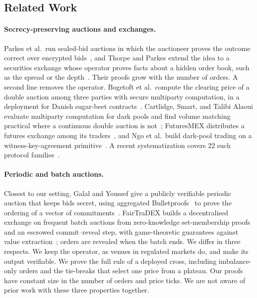 \subsection{Related Work}
\label{sec:related}

\paragraph{Secrecy-preserving auctions and exchanges.}
Parkes et al.\ run sealed-bid auctions in which the auctioneer proves the outcome correct over encrypted bids~\cite{parkes2008}, and Thorpe and Parkes extend the idea to a securities exchange whose operator proves facts about a hidden order book, such as the spread or the depth~\cite{thorpe2007}. Their proofs grow with the number of orders. A second line removes the operator. Bogetoft et al.\ compute the clearing price of a double auction among three parties with secure multiparty computation, in a deployment for Danish sugar-beet contracts~\cite{bogetoft2009}. Cartlidge, Smart, and Talibi Alaoui evaluate multiparty computation for dark pools and find volume matching practical where a continuous double auction is not~\cite{cartlidge2019}; FuturesMEX distributes a futures exchange among its traders~\cite{massacci2018}, and Ngo et al.\ build dark-pool trading on a witness-key-agreement primitive~\cite{ngo2021}. A recent systematization covers 22 such protocol families~\cite{arote2026}.

\paragraph{Periodic and batch auctions.}
Closest to our setting, Galal and Youssef give a publicly verifiable periodic auction that keeps bids secret, using aggregated Bulletproofs~\cite{bulletproofs2018} to prove the ordering of a vector of commitments~\cite{galal2021}. FairTraDEX builds a decentralised exchange on frequent batch auctions from zero-knowledge set-membership proofs and an escrowed commit--reveal step, with game-theoretic guarantees against value extraction~\cite{fairtradex2022}; orders are revealed when the batch ends. We differ in three respects. We keep the operator, as venues in regulated markets do, and make its output verifiable. We prove the full rule of a deployed cross, including imbalance-only orders and the tie-breaks that select one price from a plateau. Our proofs have constant size in the number of orders and price ticks. We are not aware of prior work with these three properties together.

